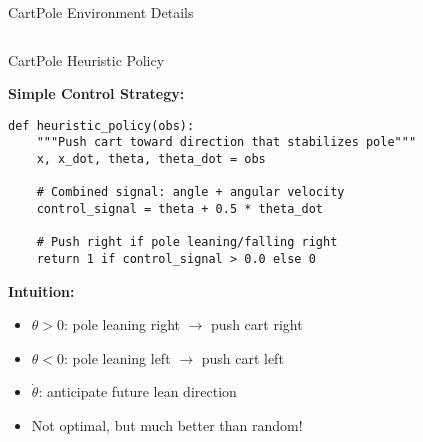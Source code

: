 \documentclass[aspectratio=169,10pt]{beamer}
\begin{document}
\begin{frame}{CartPole Environment Details}
\begin{columns}[T]
\begin{column}{0.6\textwidth}
\end{column}
\end{columns}

\end{frame}

\begin{frame}[fragile]{CartPole Heuristic Policy}

\textbf{Simple Control Strategy:}

\begin{lstlisting}
def heuristic_policy(obs):
    """Push cart toward direction that stabilizes pole"""
    x, x_dot, theta, theta_dot = obs
    
    # Combined signal: angle + angular velocity
    control_signal = theta + 0.5 * theta_dot
    
    # Push right if pole leaning/falling right
    return 1 if control_signal > 0.0 else 0
\end{lstlisting}

\vfill

\textbf{Intuition:}
\begin{itemize}
    \item $\theta > 0$: pole leaning right $\rightarrow$ push cart right
    \item $\theta < 0$: pole leaning left $\rightarrow$ push cart left  
    \item $\dot{\theta}$: anticipate future lean direction
    \item Not optimal, but much better than random!
\end{itemize}

\end{frame}
\end{document}
